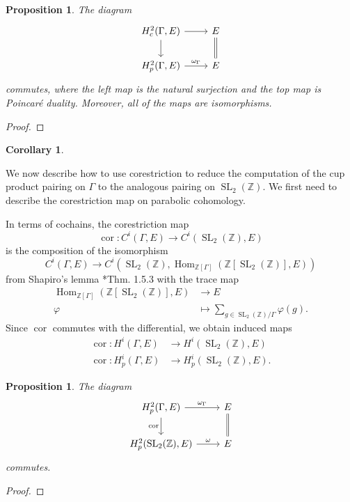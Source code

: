 \documentclass[10pt]{amsart}
\theoremstyle{plain}
\newtheorem{proposition}[theorem]{Proposition}
\newtheorem{corollary}[theorem]{Corollary}
\theoremstyle{definition}
\newcommand{\ZZ}{{\mathbb{Z}}}
\DeclareMathOperator{\Hom}{Hom}
\DeclareMathOperator{\SL}{SL}
\DeclareMathOperator{\cor}{cor}
\begin{document}
\begin{proposition}
The diagram
\[
\begin{tikzcd}
H^2_c(\Gamma, E) \arrow{r} \arrow{d} & E \arrow[equal]{d} \\
H^2_p(\Gamma, E) \arrow{r}{\omega_\Gamma} & E
\end{tikzcd}
\]
commutes, where the left map is the natural surjection and the top map is Poincar\'e duality.  Moreover, all of the maps are isomorphisms.
\end{proposition}
\begin{proof}

\end{proof}

\begin{corollary}

\end{corollary}

We now describe how to use corestriction to reduce the computation of the cup product pairing
on $\Gamma$ to the analogous pairing on $\SL_2(\ZZ)$.  We first need to describe the corestriction
map on parabolic cohomology.

In terms of cochains, the corestriction map
\[
\cor : C^i(\Gamma, E) \to C^i(\SL_2(\ZZ), E)
\]
is the composition of the isomorphism
\[
C^i(\Gamma, E) \to C^i(\SL_2(\ZZ), \Hom_{\ZZ[\Gamma]}(\ZZ[\SL_2(\ZZ)], E))
\]
from Shapiro's lemma \cite{Sharifi}*{Thm. 1.5.3} with the trace map
\begin{align*}
\Hom_{\ZZ[\Gamma]}(\ZZ[\SL_2(\ZZ)], E) &\to E \\
\varphi &\mapsto \sum_{g \in \SL_2(\ZZ)/\Gamma} \varphi(g).
\end{align*}
Since $\cor$ commutes with the differential, we obtain induced maps
\begin{align*}
\cor : H^i(\Gamma, E) &\to H^i(\SL_2(\ZZ), E) \\
\cor : H^i_p(\Gamma, E) &\to H^i_p(\SL_2(\ZZ), E).
\end{align*}

\begin{proposition}
The diagram
\[
\begin{tikzcd}
H^2_p(\Gamma, E) \ar{r}{\omega_\Gamma} \ar[swap]{d}{\cor} & E \ar[equal]{d} \\
H^2_p(\SL_2(\ZZ), E) \ar{r}{\omega} & E
\end{tikzcd}
\]
commutes.
\end{proposition}
\begin{proof}

\end{proof}
\end{document}
